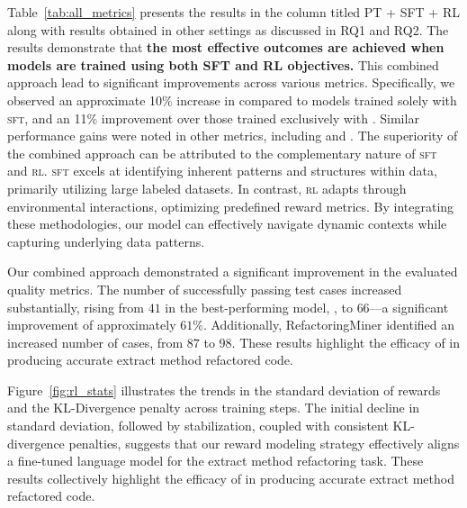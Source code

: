 Table~\ref{tab:all_metrics} presents the results in the column titled PT + SFT + RL
along with results obtained in other settings as discussed in RQ1 and RQ2.
The results demonstrate that \textbf{the most effective outcomes are achieved when models are trained using both SFT and RL objectives.} This combined approach lead to significant improvements across various metrics. Specifically, we observed an approximate 10\% increase in \codebleu{} compared to models trained solely with \textsc{sft}, and an 11\% improvement over those trained exclusively with \rl{}. Similar performance gains were noted in other metrics, including \bleu{} and \rouge{}.
The superiority of the combined approach can be attributed to the complementary nature of \textsc{sft} and \textsc{rl}. \textsc{sft} excels at identifying inherent patterns and structures within data, primarily utilizing large labeled datasets. In contrast, \textsc{rl} adapts through environmental interactions, optimizing predefined reward metrics. By integrating these methodologies, our model can effectively navigate dynamic contexts while capturing underlying data patterns.

Our combined approach demonstrated a significant improvement in the evaluated quality metrics. The number of successfully passing test cases increased substantially, rising from $41$ in the best-performing model, \codetf{}, to $66$---a significant improvement of approximately $61\%$. Additionally, RefactoringMiner identified an increased number of cases, from $87$ to $98$. These results highlight the efficacy of \rl{} in producing accurate extract method refactored code.

Figure~\ref{fig:rl_stats} illustrates the trends in the standard deviation of rewards and the KL-Divergence penalty across training steps. The initial decline in standard deviation, followed by stabilization, coupled with consistent KL-divergence penalties, suggests that our reward modeling strategy effectively aligns a fine-tuned language model for the extract method refactoring task. These results collectively highlight the efficacy of \rl{} in producing accurate extract method refactored code.

